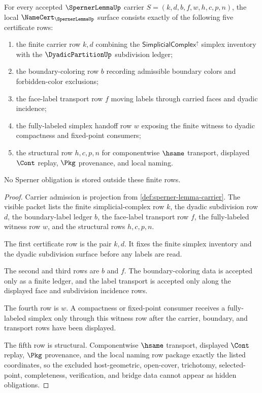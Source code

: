 \begin{theorem}
\label{thm:sperner-lemma-namecert-obligations}
For every accepted $\SpernerLemmaUp$ carrier $S=(k,d,b,f,w,h,c,p,n)$, the local $\NameCert_{\SpernerLemmaUp}$ surface consists exactly of the following five certificate rows:
\begin{enumerate}
\item the finite carrier row $k,d$ combining the $\mathsf{SimplicialComplex}^{\uparrow}$ simplex inventory with the $\DyadicPartitionUp$ subdivision ledger;
\item the boundary-coloring row $b$ recording admissible boundary colors and forbidden-color exclusions;
\item the face-label transport row $f$ moving labels through carried faces and dyadic incidence;
\item the fully-labeled simplex handoff row $w$ exposing the finite witness to dyadic compactness and fixed-point consumers;
\item the structural row $h,c,p,n$ for componentwise $\hsame$ transport, displayed $\Cont$ replay, $\Pkg$ provenance, and local naming.
\end{enumerate}
No Sperner obligation is stored outside these finite rows.
\end{theorem}
\begin{proof}
Carrier admission is projection from \autoref{def:sperner-lemma-carrier}. The visible packet lists the finite simplicial-complex row $k$, the dyadic subdivision row $d$, the boundary-label ledger $b$, the face-label transport row $f$, the fully-labeled witness row $w$, and the structural rows $h,c,p,n$.

The first certificate row is the pair $k,d$. It fixes the finite simplex inventory and the dyadic subdivision surface before any labels are read.

The second and third rows are $b$ and $f$. The boundary-coloring data is accepted only as a finite ledger, and the label transport is accepted only along the displayed face and subdivision incidence rows.

The fourth row is $w$. A compactness or fixed-point consumer receives a fully-labeled simplex only through this witness row after the carrier, boundary, and transport rows have been displayed.

The fifth row is structural. Componentwise $\hsame$ transport, displayed $\Cont$ replay, $\Pkg$ provenance, and the local naming row package exactly the listed coordinates, so the excluded host-geometric, open-cover, trichotomy, selected-point, completeness, verification, and bridge data cannot appear as hidden obligations.
\end{proof}

